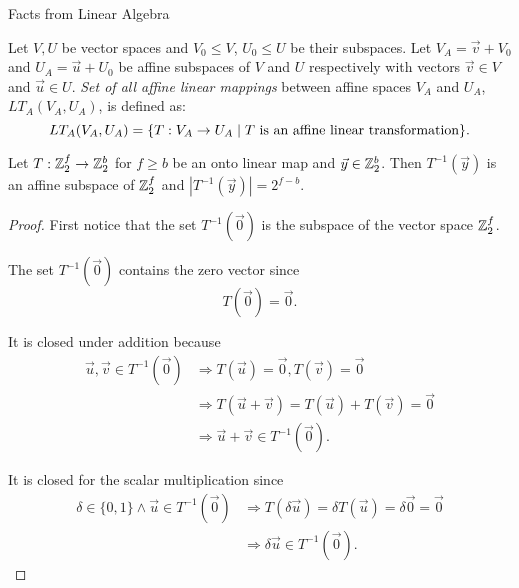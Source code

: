 \begin{chapter}{Facts from Linear Algebra}
\begin{definition}
Let $V, U$ be vector spaces and $V_0 \leq V$, $U_0 \leq U$ be their subspaces. Let $V_A = \vec{v} + V_0$ and $U_A = \vec{u} + U_0$ be affine subspaces of $V$ and $U$ respectively with vectors $\vec{v} \in V$ and $\vec{u} \in U$. \emph{Set of all affine linear mappings} between affine spaces $V_A$ and $U_A$, $LT_A(V_A, U_A)$, is defined as:
\[
	LT_A(V_A, U_A) = \{ T: V_A \rightarrow U_A \mid T \text{ is an affine linear transformation} \} \text{.}
\]
\end{definition}

\begin{lemma}
\label{lemma-linear-transformation-domain-distribution}
Let $T: \mathbb{Z}_{2}^{f} \rightarrow \mathbb{Z}_{2}^{b}$ for $f \geq b$ be an onto linear map and $\vec{y} \in \mathbb{Z}_{2}^{b}$. Then $T^{-1}(\vec{y})$ is an affine subspace of $\mathbb{Z}_{2}^{f}$ and $|T^{-1}(\vec{y})| = 2 ^ {f - b}$.
\end{lemma}
\begin{proof}
First notice that the set $T^{-1}(\vec{0})$ is the subspace of the vector space $\mathbb{Z}_{2}^{f}$.

The set $T^{-1}(\vec{0})$ contains the zero vector since
\[ 
	T(\vec{0}) = \vec{0} \text{.} 
\]

It is closed under addition because
\[
\begin{split}
\vec{u}, \vec{v} \in T^{-1}(\vec{0}) 
	& \Rightarrow T(\vec{u}) = \vec{0}, T(\vec{v}) = \vec{0} \\ 
	& \Rightarrow T(\vec{u} + \vec{v}) = T(\vec{u}) + T(\vec{v}) = \vec{0} \\ 
	& \Rightarrow \vec{u} + \vec{v} \in T^{-1}(\vec{0}) \text{.}
\end{split}
\]

It is closed for the scalar multiplication since
\[
\begin{split}
\delta \in \{0, 1\} \wedge \vec{u} \in T^{-1}(\vec{0}) 
	& \Rightarrow T(\delta \vec{u}) = \delta T(\vec{u}) = \delta \vec{0} = \vec{0} \\
	& \Rightarrow \delta \vec{u} \in T^{-1}(\vec{0}) \text{.}
\end{split}
\]


\end{proof}
\end{chapter}
